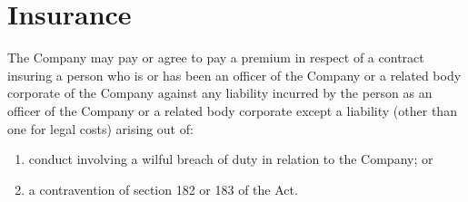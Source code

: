 \section{Insurance}

The Company may pay or agree to pay a premium in respect of a contract insuring a person who is or has been an officer of the Company or a related body corporate of the Company against any liability incurred by the person as an officer of the Company or a related body corporate except a liability (other than one for legal costs) arising out of:

\begin{enumerate}[label=(\alph*)]
    \item conduct involving a wilful breach of duty in relation to the Company; or
    \item a contravention of section 182 or 183 of the Act.
\end{enumerate} 